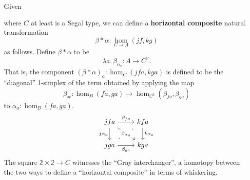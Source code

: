 \documentclass[12pt]{amsart}
\theoremstyle{plain}
\theoremstyle{definition}
\theoremstyle{remark}
\numberwithin{equation}{section}
\newcommand{\extfn}[1]{{#1}_\#}
\def\nat#1#2{\underset{#1\to#2}{\hom}}
\newcommand{\lam}[1]{\lambda #1.\,}
\newcommand{\two}{\mathbb{2}}
\begin{document}
Given
where $C$ at least is a Segal type, we can define a \textbf{horizontal composite} natural transformation
\[
\beta\ast\alpha :\nat CA(jf,kg)
\]
as follows. Define $\beta\ast\alpha$ to be
\[
\lam{a}\beta_{\alpha_a} : A \to C^\two.
\]
That is, the component $(\beta\ast\alpha)_a : \hom_C(jfa, kga)$ is defined to be the ``diagonal'' 1-simplex of the term obtained by applying the map
\[ \extfn\beta : \hom_{B}(fa,ga) \to \hom_{C^\two}(\beta_{fa}, \beta_{ga})\] to $\alpha_a : \hom_{B}(fa,ga)$.
\[
\begin{tikzcd}
jfa \arrow[r, "\beta_{fa}"] \arrow[dr, "\beta_{\alpha_a}" description] \arrow[d, "j\alpha_a"'] & kfa \arrow[d, "k\alpha_a"] \\ jga \arrow[r, "\beta_{ga}"']  \arrow[ur, phantom, "\cdot" very near start, "\cdot" very near end]  & kga
\end{tikzcd}
\]
The square $\two \times \two \to C$ witnesses the ``Gray interchanger'', a homotopy between the two ways to define a ``horizontal composite'' in terms of whiskering.
\end{document}
